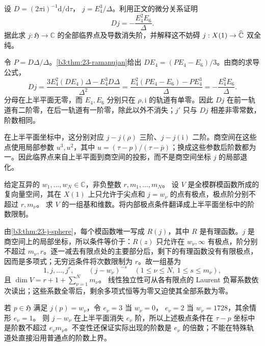 \begin{exercise}\label{b3:ex:23-6}
设 \(D=(2\pi\mathrm{i})^{-1}\mathrm{d}/\mathrm{d}\tau\)，
\(j=E_4^3/\Delta\)。利用正文的微分关系证明
\[
Dj=-\frac{E_4^2E_6}{\Delta}.
\]
据此求 \(j:\mathfrak H\to\mathbb C\) 的全部临界点及导数消失阶，并解释这不妨碍 \(j:X(1)\to\widehat{\mathbb C\kern0pt}\) 双全纯。
\end{exercise}
\begin{solution}
令 \(P=D\Delta/\Delta\)。\cref{b3:thm:23-ramanujan}给出
\(DE_4=(PE_4-E_6)/3\)。由商的求导公式，
\[
Dj=\frac{3E_4^2(DE_4)\Delta-E_4^3D\Delta}{\Delta^2}
=\frac{E_4^2(PE_4-E_6)-PE_4^3}{\Delta}
=-\frac{E_4^2E_6}{\Delta}.
\]
分母在上半平面无零，而 \(E_4,E_6\) 分别只在 \(\rho,\mathrm{i}\) 的轨道有单零。因此 \(Dj\) 在前一轨道有二阶零，在后一轨道有一阶零，除此以外不消失；\(j'\) 只与 \(Dj\) 相差非零常数，阶数相同。

在上半平面坐标中，这分别对应 \(j-j(\rho)\) 三阶、\(j-j(\mathrm{i})\) 二阶。商空间在这些点使用局部参数 \(u^3,u^2\)，其中
\(u=(\tau-p)/(\tau-\bar p)\)；换成这些参数后阶数都为一。因此临界点来自上半平面到商空间的投影，而不是商空间坐标 \(j\) 的局部退化。
\end{solution}

\begin{exercise}\label{b3:ex:23-7}
给定互异的 \(w_1,\ldots,w_N\in\mathbb C\)，非负整数 \(r,m_1,\ldots,m_N\)。
设 \(V\) 是全模群模函数所成的复向量空间，其在 \(X(1)\) 上只允许于尖点和 \(j=w_\nu\) 的点有极点，极点阶分别不超过 \(r,m_\nu\)。
求 \(V\) 的一组基和维数。将内部极点条件翻译成上半平面坐标中的阶数限制。
\end{exercise}
\begin{solution}
由\cref{b3:thm:23-j-sphere}，每个模函数唯一写成 \(R(j)\)，其中 \(R\) 是有理函数。\(j\) 是商空间上的局部坐标，所以条件等价于：\(R(z)\) 只允许在 \(w_\nu,\infty\) 有极点，阶分别不超过 \(m_\nu,r\)。逐一减去有限点处的主要部分后，剩下的有理函数没有有限极点，因而是多项式；无穷远条件将次数限制为 \(r\)。故一组基为
\[
1,j,\ldots,j^r,\qquad
(j-w_\nu)^{-s}\quad
(1\le\nu\le N,\ 1\le s\le m_\nu),
\]
且 \(\dim V=r+1+\sum_{\nu=1}^N m_\nu\)。
线性独立性可从各有限点的 Laurent 负幂系数依次读出；这些系数全零后，剩余多项式恒等为零又迫使其全部系数为零。

若 \(p\in\mathfrak H\) 满足 \(j(p)=w_\nu\)，令
\(e_\nu=3\) 当 \(w_\nu=0\)，
\(e_\nu=2\) 当 \(w_\nu=1728\)，其余情形 \(e_\nu=1\)。
则 \(j-w_\nu\) 在上半平面消失 \(e_\nu\) 阶，所以上述极点条件在 \(\tau-p\) 坐标中是阶数不超过 \(e_\nu m_\nu\)。不变性还保证实际出现的阶数是 \(e_\nu\) 的倍数；不能在特殊轨道处直接沿用普通点的阶数上界。
\end{solution}

